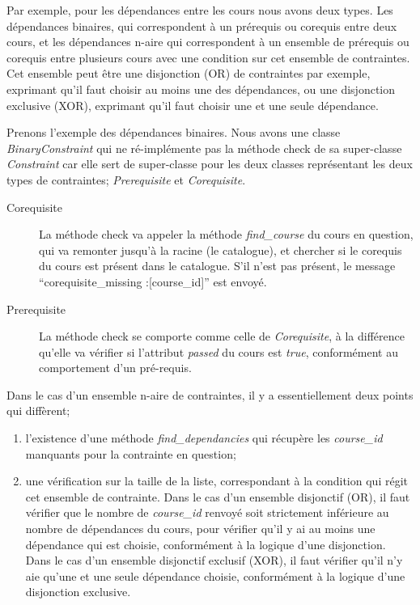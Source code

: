 Par exemple, pour les dépendances entre les cours nous avons deux types. Les dépendances binaires, qui correspondent à un prérequis ou corequis entre deux cours, et les dépendances n-aire qui correspondent à un ensemble de prérequis ou corequis entre plusieurs cours avec une condition sur cet ensemble de contraintes. Cet ensemble peut être une disjonction (OR) de contraintes par exemple, exprimant qu'il faut choisir au moins une des dépendances, ou une disjonction exclusive (XOR), exprimant qu'il faut choisir une et une seule dépendance. 

Prenons l'exemple des dépendances binaires. Nous avons une classe \textit{BinaryConstraint} qui ne ré-implémente pas la méthode check de sa super-classe \textit{Constraint} car elle sert de super-classe pour les deux classes représentant les deux types de contraintes; \textit{Prerequisite} et \textit{Corequisite}. 

\begin{description}
  \item[Corequisite] La méthode check va appeler la méthode \textit{find\_course} du cours en question, qui va remonter jusqu'à la racine (le catalogue), et chercher si le corequis du cours est présent dans le catalogue. S'il n'est pas présent, le message ``corequisite\_missing :[course\_id]'' est envoyé.
  \item[Prerequisite] La méthode check se comporte comme celle de \textit{Corequisite}, à la différence qu'elle va vérifier si l'attribut \textit{passed} du cours est \textit{true}, conformément au comportement d'un pré-requis. 
\end{description}

Dans le cas d'un ensemble n-aire de contraintes, il y a essentiellement deux points qui diffèrent;
\begin{enumerate}
  \item l'existence d'une méthode \textit{find\_dependancies} qui récupère les \textit{course\_id} manquants pour la contrainte en question;
  \item une vérification sur la taille de la liste, correspondant à la condition qui régit cet ensemble de contrainte. Dans le cas d'un ensemble disjonctif (OR), il faut vérifier que le nombre de \textit{course\_id} renvoyé soit strictement inférieure au nombre de dépendances du cours, pour vérifier qu'il y ai au moins une dépendance qui est choisie, conformément à la logique d'une disjonction. Dans le cas d'un ensemble disjonctif exclusif (XOR), il faut vérifier qu'il n'y aie qu'une et une seule dépendance choisie, conformément à la logique d'une disjonction exclusive.
\end{enumerate}

